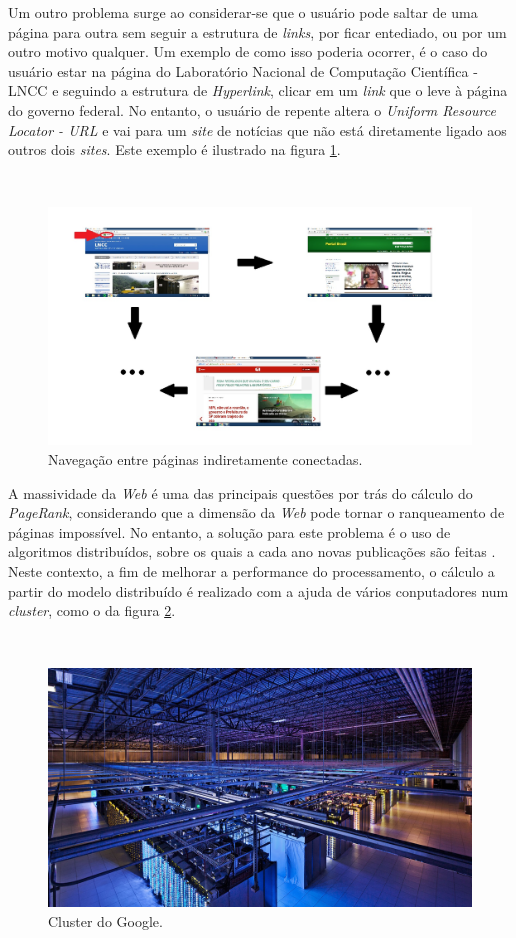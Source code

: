 \documentclass[a4paper]{report} %
\begin{document}
Um outro problema surge ao considerar-se que o usuário pode saltar de uma página para outra sem seguir a estrutura de \textit{links}, por ficar entediado, ou por um outro motivo qualquer. Um exemplo de como isso poderia ocorrer, é o caso do usuário estar na página do Laboratório Nacional de Computação Científica - LNCC e seguindo a estrutura de \textit{Hyperlink}, clicar em um \textit{link} que o leve à página do governo federal. No entanto, o usuário de repente altera o \textit{Uniform Resource Locator - URL} e vai para um \textit{site} de notícias que não está diretamente ligado aos outros dois \textit{sites}. Este exemplo é ilustrado na figura \ref{tele}.

\
\begin{figure}[!htb]
	\centering
	\includegraphics[scale=0.3]{imagens/tele}
	\caption{Navegação entre páginas indiretamente conectadas.}
	\label{tele}
\end{figure}

A massividade da \textit{Web} é uma das principais questões por trás do cálculo do \textit{PageRank}, considerando que a dimensão da \textit{Web} pode tornar o ranqueamento de páginas impossível. No entanto, a solução para este problema é o uso de algoritmos distribuídos, sobre os quais a cada ano novas publicações são feitas \cite{lei2015distributed}. Neste contexto, a fim de melhorar a performance do processamento, o cálculo a partir do modelo distribuído é realizado com a ajuda de vários conputadores num \textit{cluster}, como o da figura \ref{cluster}.  

\
\begin{figure}[!htb]
	\centering
	\includegraphics[scale=0.1]{imagens/cluster}
	\caption{Cluster do Google.}
	\label{cluster}
\end{figure}
\end{document}
